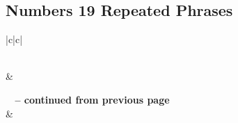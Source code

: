 \subsection{Numbers 19 Repeated Phrases}


\normalsize
 
\begin{center}
\begin{longtable}{|c|c|}
\caption[Numbers 19 Repeated Phrases]{Numbers 19 Repeated Phrases}\label{table:Repeated Phrases Numbers 19} \\
\hline {} &  \\ \hline 
\endfirsthead
 
{{\bfseries \tablename\ \thetable{} -- continued from previous page}} \\  
\hline {} &  \\ \hline 
\endhead
 

\end{longtable}
\end{center}
